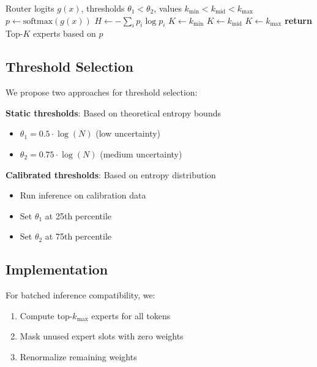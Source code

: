 \documentclass{article}
\begin{document}
\begin{algorithm}
\caption{Adaptive-K Routing}
\label{alg:adaptive_k}
\begin{algorithmic}[1]
\REQUIRE Router logits $g(x)$, thresholds $\theta_1 < \theta_2$, values $k_{\min} < k_{\text{mid}} < k_{\max}$
\STATE $p \leftarrow \text{softmax}(g(x))$
\STATE $H \leftarrow -\sum_i p_i \log p_i$
    \STATE $K \leftarrow k_{\min}$
    \STATE $K \leftarrow k_{\text{mid}}$
\ELSE
    \STATE $K \leftarrow k_{\max}$
\ENDIF
\STATE \textbf{return} Top-$K$ experts based on $p$
\end{algorithmic}
\end{algorithm}

\subsection{Threshold Selection}

We propose two approaches for threshold selection:

\textbf{Static thresholds}: Based on theoretical entropy bounds
\begin{itemize}
    \item $\theta_1 = 0.5 \cdot \log(N)$ (low uncertainty)
    \item $\theta_2 = 0.75 \cdot \log(N)$ (medium uncertainty)
\end{itemize}

\textbf{Calibrated thresholds}: Based on entropy distribution
\begin{itemize}
    \item Run inference on calibration data
    \item Set $\theta_1$ at 25th percentile
    \item Set $\theta_2$ at 75th percentile
\end{itemize}

\subsection{Implementation}

For batched inference compatibility, we:
\begin{enumerate}
    \item Compute top-$k_{\max}$ experts for all tokens
    \item Mask unused expert slots with zero weights
    \item Renormalize remaining weights
\end{enumerate}
\end{document}
